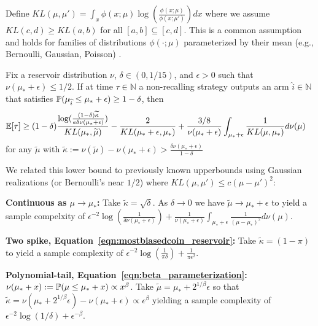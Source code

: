 Define
$KL(\mu,\mu') = \int_{x} \phi(x;\mu) \log\left( \frac{\phi(x;\mu)}{\phi(x;\mu')}\right) dx$
where we assume $KL(c,d) \geq KL(a,b)$ for all $[a,b] \subseteq [c,d]$.
This is a common assumption and holds for families of distributions $\phi( \cdot ; \mu)$ parameterized by their mean (e.g., Bernoulli, Gaussian, Poisson) \cite{kaufmann2016complexity}.
\begin{theorem}\label{thm:fb-lb}
Fix a reservoir distribution $\nu$, $\delta \in (0,1/15)$, and $\epsilon >0$ such that $\nu(\mu_*+\epsilon) \leq 1/2$.
If at time $\tau \in \mathbb{N}$ a non-recalling strategy outputs an arm $\widehat{i} \in \mathbb{N}$ that satisfies $\P(\mu_{\widehat{i}} \leq \mu_* + \epsilon ) \geq 1-\delta$, then
\begin{align*}
\E[ \tau ] &\geq (1-\delta)\frac{  \log(\tfrac{(1-\delta)\widetilde{\kappa}}{e \delta \nu(\mu_*+\epsilon)})}{KL(\mu_* , \widetilde{\mu})}  - \frac{2}{KL(\mu_* + \epsilon, \mu_*)}  + \frac{3/8}{\nu(\mu_*+\epsilon)} \int_{\mu_*+\epsilon} \frac{1}{KL(\mu,\mu_*)} d\nu(\mu) 
\end{align*}
for any $\widetilde{\mu}$ with $\widetilde{\kappa} := \nu(\widetilde{\mu}) - \nu(\mu_*+\epsilon) > \frac{ \delta \nu(\mu_*+\epsilon)}{1-\delta}$
\end{theorem}


\noindent We related this lower bound to previously known upperbounds using Gaussian realizations (or Bernoulli's near $1/2$) where $KL(\mu,\mu') \leq c (\mu-\mu')^2$: 

\noindent\textbf{Continuous as $\mu \rightarrow \mu_*$:} Take $\widetilde{\kappa} = \sqrt{\delta}$. As $\delta \rightarrow 0$ we have $\widetilde{\mu} \rightarrow \mu_*+\epsilon$ to yield a sample compelxity of $\epsilon^{-2} \log(\tfrac{1}{ \delta \nu(\mu_*+\epsilon)}) + \frac{1}{\nu(\mu_*+\epsilon)} \int_{\mu_*+\epsilon} \frac{1}{(\mu-\mu_*)^2} d\nu(\mu)$.

\noindent\textbf{Two spike, Equation~\ref{eqn:mostbiasedcoin_reservoir}:} Take $\widetilde{\kappa} = (1-\pi)$ to yield a sample complexity of $\epsilon^{-2} \log(\tfrac{1}{\pi \delta}) + \frac{1}{\pi \epsilon^2}$.

\noindent\textbf{Polynomial-tail, Equation~\ref{eqn:beta_parameterization}:} $\nu(\mu_* + x) := \P( \mu \leq \mu_* + x) \propto x^\beta$. Take $\widetilde{\mu} = \mu_* + 2^{1/\beta} \epsilon$ so that $\widetilde{\kappa} = \nu(\mu_*+2^{1/\beta} \epsilon) - \nu(\mu_* + \epsilon) \propto \epsilon^\beta$ yielding a sample complexity of $\epsilon^{-2}\log(1/\delta) + \epsilon^{-\beta}$.

